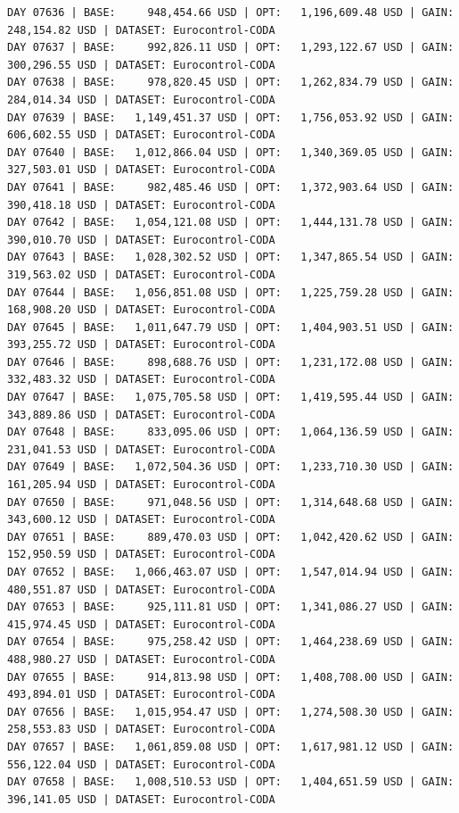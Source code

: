 \documentclass[11pt,a4paper]{article}
\begin{document}
\begin{verbatim}
DAY 07636 | BASE:     948,454.66 USD | OPT:   1,196,609.48 USD | GAIN: 248,154.82 USD | DATASET: Eurocontrol-CODA
DAY 07637 | BASE:     992,826.11 USD | OPT:   1,293,122.67 USD | GAIN: 300,296.55 USD | DATASET: Eurocontrol-CODA
DAY 07638 | BASE:     978,820.45 USD | OPT:   1,262,834.79 USD | GAIN: 284,014.34 USD | DATASET: Eurocontrol-CODA
DAY 07639 | BASE:   1,149,451.37 USD | OPT:   1,756,053.92 USD | GAIN: 606,602.55 USD | DATASET: Eurocontrol-CODA
DAY 07640 | BASE:   1,012,866.04 USD | OPT:   1,340,369.05 USD | GAIN: 327,503.01 USD | DATASET: Eurocontrol-CODA
DAY 07641 | BASE:     982,485.46 USD | OPT:   1,372,903.64 USD | GAIN: 390,418.18 USD | DATASET: Eurocontrol-CODA
DAY 07642 | BASE:   1,054,121.08 USD | OPT:   1,444,131.78 USD | GAIN: 390,010.70 USD | DATASET: Eurocontrol-CODA
DAY 07643 | BASE:   1,028,302.52 USD | OPT:   1,347,865.54 USD | GAIN: 319,563.02 USD | DATASET: Eurocontrol-CODA
DAY 07644 | BASE:   1,056,851.08 USD | OPT:   1,225,759.28 USD | GAIN: 168,908.20 USD | DATASET: Eurocontrol-CODA
DAY 07645 | BASE:   1,011,647.79 USD | OPT:   1,404,903.51 USD | GAIN: 393,255.72 USD | DATASET: Eurocontrol-CODA
DAY 07646 | BASE:     898,688.76 USD | OPT:   1,231,172.08 USD | GAIN: 332,483.32 USD | DATASET: Eurocontrol-CODA
DAY 07647 | BASE:   1,075,705.58 USD | OPT:   1,419,595.44 USD | GAIN: 343,889.86 USD | DATASET: Eurocontrol-CODA
DAY 07648 | BASE:     833,095.06 USD | OPT:   1,064,136.59 USD | GAIN: 231,041.53 USD | DATASET: Eurocontrol-CODA
DAY 07649 | BASE:   1,072,504.36 USD | OPT:   1,233,710.30 USD | GAIN: 161,205.94 USD | DATASET: Eurocontrol-CODA
DAY 07650 | BASE:     971,048.56 USD | OPT:   1,314,648.68 USD | GAIN: 343,600.12 USD | DATASET: Eurocontrol-CODA
DAY 07651 | BASE:     889,470.03 USD | OPT:   1,042,420.62 USD | GAIN: 152,950.59 USD | DATASET: Eurocontrol-CODA
DAY 07652 | BASE:   1,066,463.07 USD | OPT:   1,547,014.94 USD | GAIN: 480,551.87 USD | DATASET: Eurocontrol-CODA
DAY 07653 | BASE:     925,111.81 USD | OPT:   1,341,086.27 USD | GAIN: 415,974.45 USD | DATASET: Eurocontrol-CODA
DAY 07654 | BASE:     975,258.42 USD | OPT:   1,464,238.69 USD | GAIN: 488,980.27 USD | DATASET: Eurocontrol-CODA
DAY 07655 | BASE:     914,813.98 USD | OPT:   1,408,708.00 USD | GAIN: 493,894.01 USD | DATASET: Eurocontrol-CODA
DAY 07656 | BASE:   1,015,954.47 USD | OPT:   1,274,508.30 USD | GAIN: 258,553.83 USD | DATASET: Eurocontrol-CODA
DAY 07657 | BASE:   1,061,859.08 USD | OPT:   1,617,981.12 USD | GAIN: 556,122.04 USD | DATASET: Eurocontrol-CODA
DAY 07658 | BASE:   1,008,510.53 USD | OPT:   1,404,651.59 USD | GAIN: 396,141.05 USD | DATASET: Eurocontrol-CODA

\end{verbatim}
\end{document}
